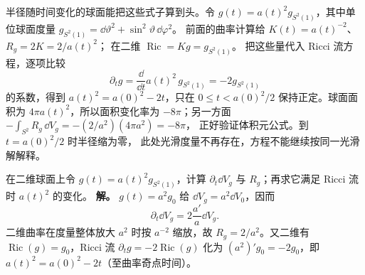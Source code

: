 半径随时间变化的球面能把这些式子算到头。令
\(g(t)=a(t)^2g_{S^2(1)}\)，其中单位球面度量
\(g_{S^2(1)}=\dd\vartheta^2+\sin^2\vartheta\,\dd\varphi^2\)。
前面的曲率计算给
\(K(t)=a(t)^{-2}\)、\(R_g=2K=2/a(t)^2\)；
在二维 \(\operatorname{Ric}=Kg=g_{S^2(1)}\)。
把这些量代入 Ricci 流方程，逐项比较
\[
\partial_tg=\frac{\dd}{\dd t}a(t)^2\,g_{S^2(1)}
=-2g_{S^2(1)}
\]
的系数，得到
\(a(t)^2=a(0)^2-2t\)，只在 \(0\le t<a(0)^2/2\)
保持正定。球面面积为 \(4\pi a(t)^2\)，所以面积变化率为
\(-8\pi\)；另一方面
\(-\int_{S^2}R_g\,\dd V_g
=-(2/a^2)(4\pi a^2)=-8\pi\)，
正好验证体积元公式。到 \(t=a(0)^2/2\) 时半径缩为零，
此处光滑度量不再存在，方程不能继续按同一光滑解解释。



\par
\begin{workedexample}
在二维球面上令 \(g(t)=a(t)^2g_{S^2(1)}\)，计算
\(\partial_t \dd V_g\) 与 \(R_g\)；再求它满足 Ricci 流时 \(a(t)^2\) 的变化。
\textbf{解。} \(g(t)=a^2g_0\) 给 \(\dd V_g=a^2\dd V_0\)，因而
\[
\partial_t\dd V_g=2\frac{a'}a\dd V_g.
\]
二维曲率在度量整体放大 \(a^2\) 时按 \(a^{-2}\) 缩放，故 \(R_g=2/a^2\)。又二维有 \(\operatorname{Ric}(g)=g_0\)，Ricci 流 \(\partial_tg=-2\operatorname{Ric}(g)\) 化为 \((a^2)'g_0=-2g_0\)，即 \(a(t)^2=a(0)^2-2t\)（至曲率奇点时间）。
\end{workedexample}
\par
